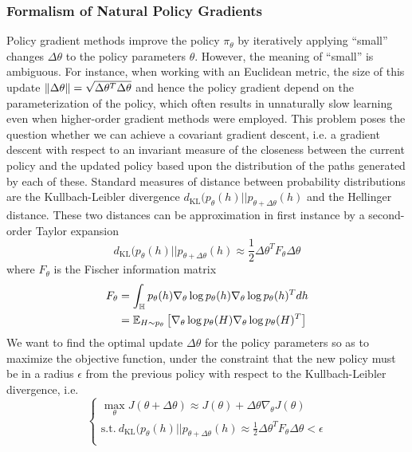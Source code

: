 \subsubsection{Formalism of Natural Policy Gradients}
Policy gradient methods improve the policy $\pi_\theta$ by iteratively applying ``small'' changes $\Delta \theta$ to the policy parameters $\theta$. However, the meaning of ``small'' is ambiguous. For instance, when working with an Euclidean metric, the size of this update $\norm{\Delta \theta} = \sqrt{\Delta\theta^T \Delta\theta}$ and hence the policy gradient depend on the parameterization of the policy, which often results in unnaturally slow learning even when higher-order gradient methods were employed. This problem poses the question whether we can achieve a covariant gradient descent, i.e. a gradient descent with respect to an invariant measure of the closeness
between the current policy and the updated policy based upon the distribution of the paths generated by each of these. Standard measures of distance between probability distributions are the Kullbach-Leibler divergence $d_{\text{KL}}(p_\theta(h) || p_{\theta + \Delta \theta}(h)$ and the Hellinger distance. These two distances can be approximation in first instance by a second-order Taylor expansion
\begin{equation*}
	d_{\text{KL}}(p_\theta(h) || p_{\theta + \Delta \theta}(h) \approx \frac{1}{2} \Delta\theta^T F_\theta \Delta\theta
\end{equation*} 
where $F_\theta$ is the Fischer information matrix
\begin{equation}
	\begin{split}
	F_\theta &= \int_{\H} p_\theta(h) \nabla_\theta\log p_\theta(h) \nabla_\theta\log p_\theta(h)^T dh\\
		&= \E[H\sim p_\theta]{\nabla_\theta\log p_\theta(H) \nabla_\theta\log p_\theta(H)^T}
	\end{split}
\end{equation}
We want to find the optimal update $\Delta \theta$ for the policy parameters so as to maximize the objective function, under the constraint that the new policy must be in a radius $\epsilon$ from the previous policy with respect to the Kullbach-Leibler divergence, i.e.
\begin{equation*}
	\begin{cases}
		\max_\theta J(\theta + \Delta \theta) \approx J(\theta) + \Delta \theta \nabla_\theta J(\theta)\\
		\text{s.t.}\ d_{\text{KL}}(p_\theta(h) || p_{\theta + \Delta \theta}(h) \approx \frac{1}{2} \Delta\theta^T F_\theta \Delta\theta < \epsilon\\  	
	\end{cases}
\end{equation*}
